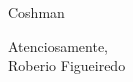 \documentclass[a4paper, 11pt]{article}
\newcommand{\Sign}[1]{\vspace{2em}\noindent Atenciosamente,\\ Roberio Figueiredo \vspace{0.5em}}
\newcommand{\Em}{Coshman}
\begin{document}
\begin{titlepage}
\Em 
\end{titlepage}


\Sign{Roberio Figueiredo}
\end{document}
